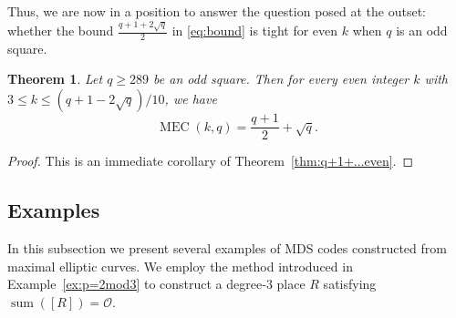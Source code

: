 \documentclass[journal,12pt,onecolumn]{IEEEtran}
\newtheorem{theorem}{Theorem}
\newcommand{\Point}{\operatorname{sum}}
\begin{document}
Thus, we are now in a position to answer the question posed at the outset: whether the bound $\frac{q+1+2\sqrt{q}}{2}$ in \eqref{eq:bound} is tight for even $k$ when $q$ is an odd square.

\begin{theorem}\label{thm:qoddsquare,evenk}
Let $q \ge 289$ be an odd square. Then for every even integer $k$ with $3 \le k \le (q + 1 - 2\sqrt{q})/10$, we have
\[
\operatorname{MEC}(k, q) = \frac{q+1}{2} + \sqrt{q}.
\]
\end{theorem}

\begin{proof}
This is an immediate corollary of Theorem~\ref{thm:q+1+...even}.
\end{proof}


\subsection{Examples}

   In this subsection we present several examples of MDS codes constructed from maximal elliptic curves. We employ the method introduced in Example~\ref{ex:p=2mod3} to construct a degree‑$3$ place $R$ satisfying $\Point([R]) = \mathcal{O}$.
\end{document}
